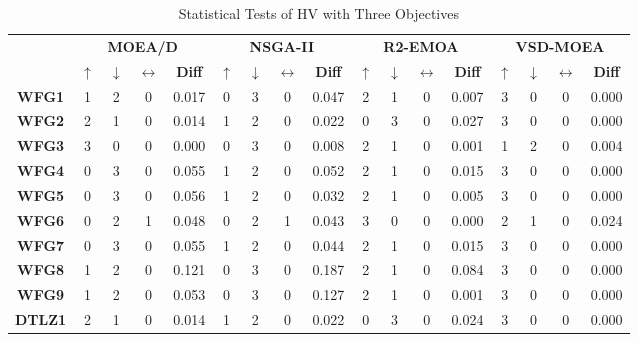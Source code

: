 \begin{table*}[t]
\caption{Statistical Tests of HV with Three Objectives}
\label{tab:Tests_HV_3obj}
\centering
\begin{tabular}{c c|c|c|c|c|c|c|c|c|c|c|c|c|c|c|c}
\cline{2-17}
 \multirow{2}{*}{} & \multicolumn{4}{c|}{\textbf{MOEA/D}} & \multicolumn{4}{c|}{\textbf{NSGA-II}} & \multicolumn{4}{c|}{\textbf{R2-EMOA}} & \multicolumn{4}{c}{\textbf{VSD-MOEA}} \\ \cline{2-17} 
 & \textbf{$\uparrow$} & \textbf{$\downarrow$} & \textbf{$\leftrightarrow$} & \textbf{Diff} & \textbf{$\uparrow$} & \textbf{$\downarrow$} & \textbf{$\leftrightarrow$} & \textbf{Diff} & \textbf{$\uparrow$} & \textbf{$\downarrow$} & \textbf{$\leftrightarrow$} & \textbf{Diff} & \textbf{$\uparrow$} & \textbf{$\downarrow$} & \textbf{$\leftrightarrow$} & \textbf{Diff} \\ \hline
\multicolumn{1}{c|}{\textbf{WFG1}} & 1 & 2 & 0 & 0.017 & 0 & 3 & 0 & 0.047 & 2 & 1 & 0 & 0.007 & 3 & 0 & 0 & 0.000 \\ \hline
\multicolumn{1}{c|}{\textbf{WFG2}} & 2 & 1 & 0 & 0.014 & 1 & 2 & 0 & 0.022 & 0 & 3 & 0 & 0.027 & 3 & 0 & 0 & 0.000 \\ \hline
\multicolumn{1}{c|}{\textbf{WFG3}} & 3 & 0 & 0 & 0.000 & 0 & 3 & 0 & 0.008 & 2 & 1 & 0 & 0.001 & 1 & 2 & 0 & 0.004 \\ \hline
\multicolumn{1}{c|}{\textbf{WFG4}} & 0 & 3 & 0 & 0.055 & 1 & 2 & 0 & 0.052 & 2 & 1 & 0 & 0.015 & 3 & 0 & 0 & 0.000 \\ \hline
\multicolumn{1}{c|}{\textbf{WFG5}} & 0 & 3 & 0 & 0.056 & 1 & 2 & 0 & 0.032 & 2 & 1 & 0 & 0.005 & 3 & 0 & 0 & 0.000 \\ \hline
\multicolumn{1}{c|}{\textbf{WFG6}} & 0 & 2 & 1 & 0.048 & 0 & 2 & 1 & 0.043 & 3 & 0 & 0 & 0.000 & 2 & 1 & 0 & 0.024 \\ \hline
\multicolumn{1}{c|}{\textbf{WFG7}} & 0 & 3 & 0 & 0.055 & 1 & 2 & 0 & 0.044 & 2 & 1 & 0 & 0.015 & 3 & 0 & 0 & 0.000 \\ \hline
\multicolumn{1}{c|}{\textbf{WFG8}} & 1 & 2 & 0 & 0.121 & 0 & 3 & 0 & 0.187 & 2 & 1 & 0 & 0.084 & 3 & 0 & 0 & 0.000 \\ \hline
\multicolumn{1}{c|}{\textbf{WFG9}} & 1 & 2 & 0 & 0.053 & 0 & 3 & 0 & 0.127 & 2 & 1 & 0 & 0.001 & 3 & 0 & 0 & 0.000 \\ \hline
\multicolumn{1}{c|}{\textbf{DTLZ1}} & 2 & 1 & 0 & 0.014 & 1 & 2 & 0 & 0.022 & 0 & 3 & 0 & 0.024 & 3 & 0 & 0 & 0.000 \\ \hline

\end{tabular}
\end{table*}
